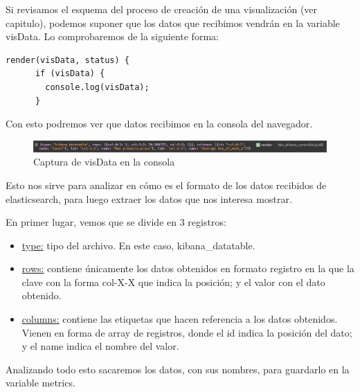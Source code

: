 \documentclass[a4paper, 12pt]{book}
\begin{document}
Si revisamos el esquema del proceso de creación de una visualización (ver capitulo), podemos suponer que los datos que recibimos vendrán en la variable visData. Lo comprobaremos de la siguiente forma:

\begin{lstlisting}[frame=single]
  render(visData, status) {
      if (visData) {
        console.log(visData);
      }
\end{lstlisting}

Con esto podremos ver que datos recibimos en la consola del navegador.

\begin{figure}[H]
  \centering
  \includegraphics[width=16cm, keepaspectratio]{img/development/captura-visData.png}
  \caption{Captura de visData en la consola}
  \label{fig:visData}
\end{figure}
Esto nos sirve para analizar en cómo es el formato de los datos recibidos de elasticsearch, para luego extraer los datos que nos interesa mostrar. 

En primer lugar, vemos que se divide en 3 registros: 
\begin{itemize}
    \item \underline{type:} tipo del archivo. En este caso, kibana\_datatable.
    \item \underline{rows:} contiene únicamente los datos obtenidos en formato registro en la que la clave con la forma col-X-X que indica la posición; y el valor con el dato obtenido.
    \item \underline{columns:} contiene las etiquetas que hacen referencia a los datos obtenidos. Vienen en forma de array de registros, donde el id indica la posición del dato; y el name indica el nombre del valor. 
\end{itemize}
Analizando todo esto sacaremos los datos, con sus nombres, para guardarlo en la variable metrics.
\end{document}
